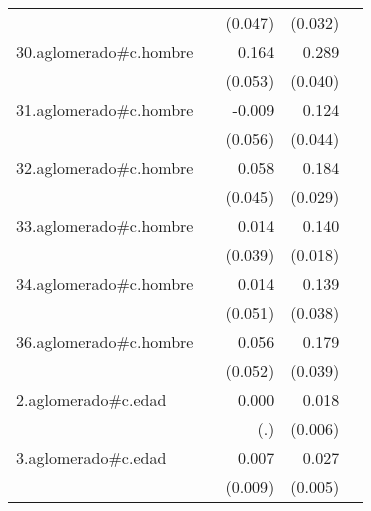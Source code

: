 {\begin{longtable}{l*{4}{D{.}{.}{-1}}}
            &                     &     (0.047)         &     (0.032)         &                     \\
\addlinespace
30.aglomerado#c.hombre&                     &       0.164\sym{**} &       0.289\sym{***}&                     \\
            &                     &     (0.053)         &     (0.040)         &                     \\
\addlinespace
31.aglomerado#c.hombre&                     &      -0.009         &       0.124\sym{**} &                     \\
            &                     &     (0.056)         &     (0.044)         &                     \\
\addlinespace
32.aglomerado#c.hombre&                     &       0.058         &       0.184\sym{***}&                     \\
            &                     &     (0.045)         &     (0.029)         &                     \\
\addlinespace
33.aglomerado#c.hombre&                     &       0.014         &       0.140\sym{***}&                     \\
            &                     &     (0.039)         &     (0.018)         &                     \\
\addlinespace
34.aglomerado#c.hombre&                     &       0.014         &       0.139\sym{***}&                     \\
            &                     &     (0.051)         &     (0.038)         &                     \\
\addlinespace
36.aglomerado#c.hombre&                     &       0.056         &       0.179\sym{***}&                     \\
            &                     &     (0.052)         &     (0.039)         &                     \\
\addlinespace
2.aglomerado#c.edad&                     &       0.000         &       0.018\sym{**} &                     \\
            &                     &         (.)         &     (0.006)         &                     \\
\addlinespace
3.aglomerado#c.edad&                     &       0.007         &       0.027\sym{***}&                     \\
            &                     &     (0.009)         &     (0.005)         &                     \\

\end{longtable}}
